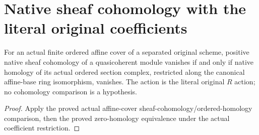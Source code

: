 \section{Native sheaf cohomology with the literal original coefficients}

\begin{lemma}
\label{lem:kn-derived-original-scalar-sheaf-cohomology}
\leanok
For an actual finite ordered affine cover of a separated original
scheme, positive native sheaf cohomology of a quasicoherent module
vanishes if and only if native homology of its actual ordered
section complex, restricted along the canonical affine-base ring
isomorphism, vanishes.  The action is the literal original $R$
action; no cohomology comparison is a hypothesis.
\end{lemma}
\begin{proof}
Apply the proved actual affine-cover sheaf-cohomology/ordered-homology
comparison, then the proved zero-homology equivalence under the
actual coefficient restriction.
\end{proof}
